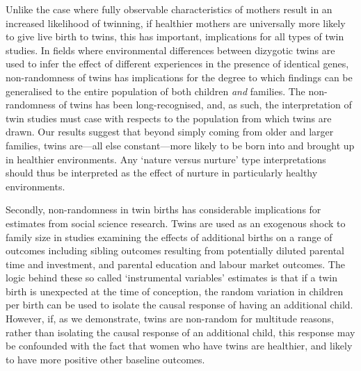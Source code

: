 \documentclass{nature}
\begin{document}
\begin{linenumbers}
Unlike the case where fully observable characteristics of mothers result in an increased likelihood of twinning, if healthier mothers are universally more likely to give live birth to twins, this has important, implications for all types of twin studies.  In fields where environmental differences between dizygotic twins are used to infer the effect of different experiences in the presence of identical genes, non-randomness of twins has implications for the degree to which findings can be generalised to the entire population of both children \emph{and} families.  The non-randomness of twins has been long-recognised\cite{Recordetal1970}, and, as such, the interpretation of twin studies must case with respects to the population from which twins are drawn.  Our results suggest that beyond simply coming from older and larger families, twins are---all else constant---more likely to be born into and brought up in healthier environments.  Any `nature versus nurture' type interpretations should thus be interpreted as the effect of nurture in particularly healthy environments.

Secondly, non-randomness in twin births has considerable implications for estimates from social science research.  Twins are used as an exogenous shock to family size in studies examining the effects of additional births on a range of outcomes including sibling outcomes resulting from potentially diluted parental time and investment, and parental education and labour market outcomes.  The logic behind these so called `instrumental variables' estimates is that if a twin birth is unexpected at the time of conception, the random variation in children per birth can be used to isolate the causal response of having an additional child.  However, if, as we demonstrate, twins are non-random for multitude reasons, rather than isolating the causal response of an additional child, this response may be confounded with the fact that women who have twins are healthier, and likely to have more positive other baseline outcomes.

\clearpage


\end{linenumbers}
\end{document}

